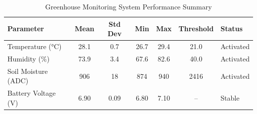 
\begin{table}[h]
\centering
\caption{Greenhouse Monitoring System Performance Summary}
\label{tab:performance}
\begin{tabular}{lcccccl}
\hline
\textbf{Parameter} & \textbf{Mean} & \textbf{Std Dev} & \textbf{Min} & \textbf{Max} & \textbf{Threshold} & \textbf{Status} \\
\hline
Temperature (°C) & 28.1 & 0.7 & 26.7 & 29.4 & 21.0 & Activated \\
Humidity (\%) & 73.9 & 3.4 & 67.6 & 82.6 & 40.0 & Activated \\
Soil Moisture (ADC) & 906 & 18 & 874 & 940 & 2416 & Activated \\
Battery Voltage (V) & 6.90 & 0.09 & 6.80 & 7.10 & -- & Stable \\
\hline
\end{tabular}
\end{table}

